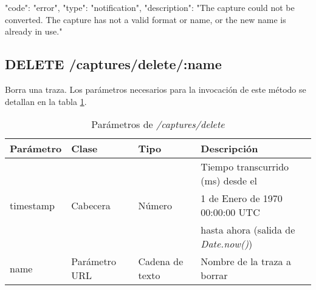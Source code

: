\begin{itemize}
{\begin{minipage}{\textwidth}
\begin{code}[language=json]
{
  "code": "error",
  "type": "notification",
  "description": "The capture could not be converted. The capture has not a valid format or name, or the new name is already in use."
}
\end{code}
\end{minipage}
}
\end{itemize}

%
%
\subsection{DELETE /captures/delete/:name}
Borra una \gls{traza}. Los parámetros necesarios para la invocación de este método se detallan en la tabla \ref{extra:api:capturesdelete:invocacion}.

\begin{table}[H]
\centering
\begin{tabular}{|l|l|l|l|}
\hline
\rowcolor[HTML]{F5F5F5}
\textbf{Parámetro}  & \textbf{Clase} & \textbf{Tipo}   & \textbf{Descripción}                        \\ \hline
                    &                &                 & Tiempo transcurrido (ms) desde el           \\
timestamp           & Cabecera       & Número          & 1 de Enero de 1970 00:00:00 UTC             \\
                    &                &                 & hasta ahora (salida de \textit{Date.now()}) \\ \hline
name                & Parámetro URL  & Cadena de texto & Nombre de la \gls{traza} a borrar           \\ \hline
\end{tabular}
\caption{Parámetros de \textit{/captures/delete}}
\label{extra:api:capturesdelete:invocacion}
\end{table}

